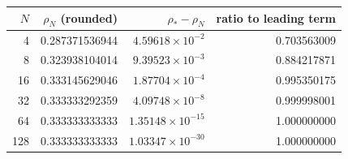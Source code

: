 \begin{tabular}{@{}rrrr@{}}
\toprule
$N$ & $\rho_N$ (rounded) & $\rho_* -\rho_N$ & ratio to leading term\\
\midrule
4 & 0.287371536944 & $4.59618\times10^{-2}$ & 0.703563009 \\
8 & 0.323938104014 & $9.39523\times10^{-3}$ & 0.884217871 \\
16 & 0.333145629046 & $1.87704\times10^{-4}$ & 0.995350175 \\
32 & 0.333333292359 & $4.09748\times10^{-8}$ & 0.999998001 \\
64 & 0.333333333333 & $1.35148\times10^{-15}$ & 1.000000000 \\
128 & 0.333333333333 & $1.03347\times10^{-30}$ & 1.000000000 \\
\bottomrule
\end{tabular}
